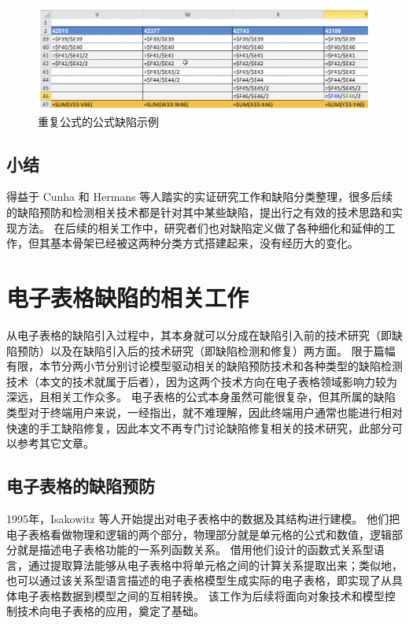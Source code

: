 \begin{figure}[tp]    
    \centering
    \includegraphics[width=\textwidth]{figure/relatedwork/DuplicatedFormula.png}
    \caption{重复公式的公式缺陷示例}
    \label{figure-DuplicatedFormula}
\end{figure}

\subsection{小结}
得益于 Cunha 和 Hermans 等人踏实的实证研究工作和缺陷分类整理\cite{cunha2012towards,hermans2012detecting2,jansen2015code}，很多后续的缺陷预防和检测相关技术都是针对其中某些缺陷，提出行之有效的技术思路和实现方法。
在后续的相关工作中，研究者们也对缺陷定义做了各种细化和延伸的工作，但其基本骨架已经被这两种分类方式搭建起来，没有经历大的变化。


\section{电子表格缺陷的相关工作}
从电子表格的缺陷引入过程中，其本身就可以分成在缺陷引入前的技术研究（即缺陷预防）以及在缺陷引入后的技术研究（即缺陷检测和修复）两方面。
限于篇幅有限，本节分两小节分别讨论模型驱动相关的缺陷预防技术和各种类型的缺陷检测技术（本文的技术就属于后者），因为这两个技术方向在电子表格领域影响力较为深远，且相关工作众多。
电子表格的公式本身虽然可能很复杂，但其所属的缺陷类型对于终端用户来说，一经指出，就不难理解，因此终端用户通常也能进行相对快速的手工缺陷修复，因此本文不再专门讨论缺陷修复相关的技术研究，此部分可以参考其它文章\cite{badame2012refactoring,jannach2014avoiding,zhang2018automated}。

\subsection{电子表格的缺陷预防}
1995年，Isakowitz 等人\cite{isakowitz1995toward}开始提出对电子表格中的数据及其结构进行建模。
他们把电子表格看做物理和逻辑的两个部分，物理部分就是单元格的公式和数值，逻辑部分就是描述电子表格功能的一系列函数关系。
借用他们设计的函数式关系型语言，通过提取算法能够从电子表格中将单元格之间的计算关系提取出来；类似地，也可以通过该关系型语言描述的电子表格模型生成实际的电子表格，即实现了从具体电子表格数据到模型之间的互相转换。
该工作为后续将面向对象技术和模型控制技术向电子表格的应用，奠定了基础。

